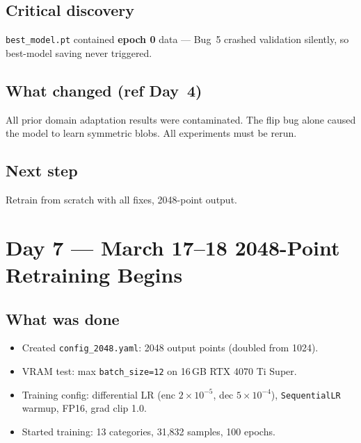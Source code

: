 \documentclass[10pt,a4paper]{article}
\begin{document}
\subsection*{Critical discovery}
\texttt{best\_model.pt} contained \textbf{epoch 0} data --- Bug~5 crashed validation silently, so best-model saving never triggered.

\subsection*{What changed (ref Day~4)}
All prior domain adaptation results were contaminated. The flip bug alone caused the model to learn symmetric blobs. All experiments must be rerun.

\subsection*{Next step}
Retrain from scratch with all fixes, 2048-point output.

\section*{Day 7 --- March 17--18 \hfill \normalfont\small 2048-Point Retraining Begins}

\subsection*{What was done}
\begin{itemize}[nosep]
    \item Created \texttt{config\_2048.yaml}: 2048 output points (doubled from 1024).
    \item VRAM test: max \texttt{batch\_size=12} on 16\,GB RTX 4070 Ti Super.
    \item Training config: differential LR (enc $2\!\times\!10^{-5}$, dec $5\!\times\!10^{-4}$), \texttt{SequentialLR} warmup, FP16, grad clip 1.0.
    \item Started training: 13 categories, 31,832 samples, 100 epochs.
\end{itemize}
\end{document}
